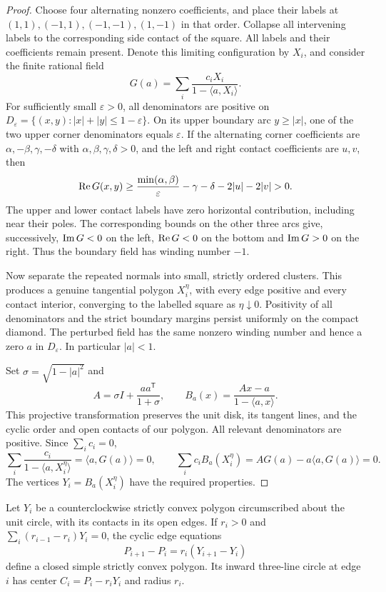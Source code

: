 \begin{proof}
Choose four alternating nonzero coefficients, and place their labels at
$(1,1),(-1,1),(-1,-1),(1,-1)$ in that order. Collapse all intervening labels
to the corresponding side contact of the square. All labels and their
coefficients remain present. Denote this limiting configuration by $X_i$,
and consider the finite rational field
\[
 G(a)=\sum_i\frac{c_i X_i}{1-\langle a,X_i\rangle}.
\]
For sufficiently small $\varepsilon>0$, all denominators are positive on
$D_\varepsilon=\{(x,y):|x|+|y|\le1-\varepsilon\}$. On its upper boundary arc
$y\ge |x|$, one of the two upper corner denominators equals $\varepsilon$.
If the alternating corner coefficients are $\alpha,-\beta,\gamma,-\delta$
with $\alpha,\beta,\gamma,\delta>0$, and the left and right contact
coefficients are $u,v$, then
\[
 \mathop{\rm Re}G(x,y)\ge
 \frac{\min(\alpha,\beta)}{\varepsilon}
       -\gamma-\delta-2|u|-2|v|>0.
\]
The upper and lower contact labels have zero horizontal contribution,
including near their poles. The corresponding bounds on the other three
arcs give, successively, $\mathop{\rm Im}G<0$ on the left,
$\mathop{\rm Re}G<0$ on the bottom and $\mathop{\rm Im}G>0$ on the right.
Thus the boundary field has winding number $-1$.

Now separate the repeated normals into small, strictly ordered clusters.
This produces a genuine tangential polygon $X_i^{\eta}$, with every edge
positive and every contact interior, converging to the labelled square as
$\eta\downarrow0$. Positivity of all denominators and the strict boundary
margins persist uniformly on the compact diamond. The perturbed field has
the same nonzero winding number and hence a zero $a$ in $D_\varepsilon$.
In particular $|a|<1$.

Set $\sigma=\sqrt{1-|a|^2}$ and
\[
 A=\sigma I+\frac{aa^{\mathsf T}}{1+\sigma},\qquad
 B_a(x)=\frac{Ax-a}{1-\langle a,x\rangle}.
\]
This projective transformation preserves the unit disk, its tangent lines,
and the cyclic order and open contacts of our polygon. All relevant
denominators are positive. Since $\sum_i c_i=0$,
\[
 \sum_i\frac{c_i}{1-\langle a,X_i^{\eta}\rangle}
 =\langle a,G(a)\rangle=0,
 \qquad
 \sum_i c_i B_a(X_i^{\eta})=A G(a)-a\langle a,G(a)\rangle=0.
\]
The vertices $Y_i=B_a(X_i^{\eta})$ have the required properties.
\end{proof}

\begin{lemma}\label{lem:side-tangent-scaling}
Let $Y_i$ be a counterclockwise strictly convex polygon circumscribed about the unit circle,
with its contacts in its open edges. If $r_i>0$ and
$\sum_i(r_{i-1}-r_i)Y_i=0$, the cyclic edge equations
\begin{equation}\label{eq:side-tangent-scaling}
 P_{i+1}-P_i=r_i(Y_{i+1}-Y_i)
\end{equation}
define a closed simple strictly convex polygon. Its inward three-line
circle at edge $i$ has center $C_i=P_i-r_iY_i$ and radius $r_i$.
\end{lemma}

